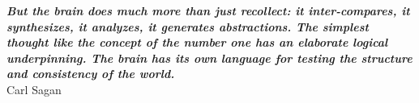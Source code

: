 \thispagestyle{empty}
\hbox{} \vfill
\begin{flushright}
    \small \textit{\textbf{But the brain does much more than just recollect: it inter-compares, it synthesizes, it analyzes, it generates abstractions. The simplest thought like the concept of the number one has an elaborate logical underpinning. The brain has its own language for testing the structure and consistency of the world.}}
    \\ \vspace{2mm}
    \scriptsize Carl Sagan
\end{flushright}

\clearpage
\thispagestyle{empty}
\cleardoublepage